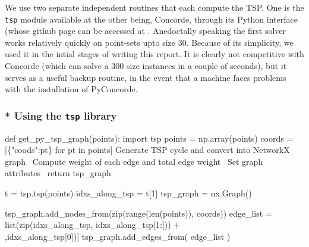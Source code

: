 We use two separate independent routines that each compute the TSP. One is the 
\verb|tsp| module available at 
the other being, Concorde, through its Python interface (whose github page can be accessed at 
. Anedoctally speaking the first solver works relatively 
quickly on point-sets upto size 30. Because of its simplicity, we used it in the intial stages of writing
this report. It is clearly not competitive with Concorde (which can solve a 300 size instances in a couple of seconds), 
but it serves as a useful backup routine, in the event that a machine faces problems with the installation of PyConcorde.

\subsubsection{* Using the \texttt{tsp} library}
\nwenddocs{}\plusendmoddef\nwstartdeflinemarkup{}\nwenddeflinemarkup
def get_py_tsp_graph(points):
     import tsp
     points = np.array(points)
     coords = [\{"coods":pt\} for pt in points]
     \LA{}Generate TSP cycle and convert into NetworkX graph~{\nwtagstyle{}}\RA{}
     \LA{}Compute weight of each edge and total edge weight~{\nwtagstyle{}}\RA{}
     \LA{}Set graph attributes~{\nwtagstyle{}}\RA{}     
     return tsp_graph
\nwendcode{}\nwdocspar


\nwenddocs{}\endmoddef\nwstartdeflinemarkup{}\nwenddeflinemarkup
t              = tsp.tsp(points)
idxs_along_tsp = t[1]
tsp_graph      = nx.Graph()

tsp_graph.add_nodes_from(zip(range(len(points)), coords))
edge_list = list(zip(idxs_along_tsp, idxs_along_tsp[1:])) + \\
                  [(idxs_along_tsp[-1],idxs_along_tsp[0])]
tsp_graph.add_edges_from(  edge_list  )
\nwendcode{}\nwdocspar


